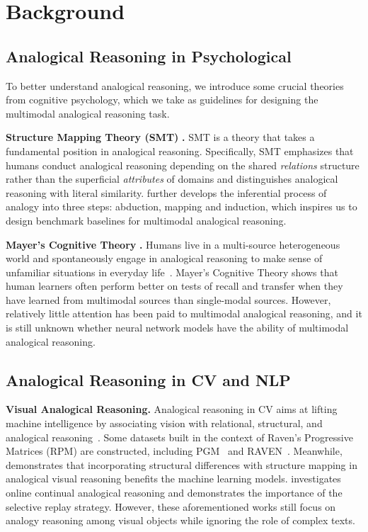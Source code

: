 \documentclass{article} \usepackage{iclr2023_conference,times}
\begin{document}
 
 

\section{Background}

\subsection{Analogical Reasoning in Psychological}
To better understand analogical reasoning, we introduce some crucial theories from cognitive psychology, which we take as guidelines for designing the multimodal analogical reasoning task.

\textbf{Structure Mapping Theory (SMT)} \citep{smp}\textbf{.}
SMT is a theory that takes a fundamental position in analogical reasoning. 
Specifically, SMT emphasizes that humans conduct analogical reasoning depending on the shared \textit{relations} structure rather than the superficial \textit{attributes} of domains and distinguishes analogical reasoning with literal similarity.
\cite{minnameier2010abduction} further develops the inferential process of analogy into three steps: abduction, mapping and induction, 
which inspires us to design benchmark baselines for multimodal analogical reasoning.
 
\textbf{Mayer's Cognitive Theory} \citep{hegarty1993constructing,mayer2002multimedia}\textbf{.} 
Humans live in a multi-source heterogeneous world and spontaneously engage in analogical reasoning to make sense of unfamiliar situations in everyday life~\citep{vamvakoussi2019use}. 
Mayer's Cognitive Theory shows that human learners often perform better on tests of recall and transfer when they have learned from multimodal sources than single-modal sources. 
However, relatively little attention has been paid to multimodal analogical reasoning, and it is still unknown whether neural network models have the ability of multimodal analogical reasoning.

 
\subsection{Analogical Reasoning in CV and NLP}

\textbf{Visual Analogical  Reasoning.}
Analogical reasoning in CV aims at lifting machine intelligence by associating vision with relational, structural, and analogical reasoning~\citep{CLEVR,DBLP:conf/ijcai/PradeR21,DBLP:conf/aaai/HuMLWB21,DBLP:journals/corr/abs-2201-12382}.
Some datasets built in the context of Raven's Progressive Matrices (RPM) are constructed, including PGM~\citep{PGM} and RAVEN~\citep{RAVEN}. 
Meanwhile, \cite{DBLP:conf/iclr/HillSBML19} demonstrates that incorporating structural differences with structure mapping in analogical visual reasoning benefits the machine learning models.
\cite{DBLP:conf/cvpr/HayesK21} investigates online continual analogical reasoning and demonstrates the importance of the selective replay strategy. 
However, these aforementioned works still focus on analogy reasoning among visual objects while ignoring the role of complex texts.
\end{document}
